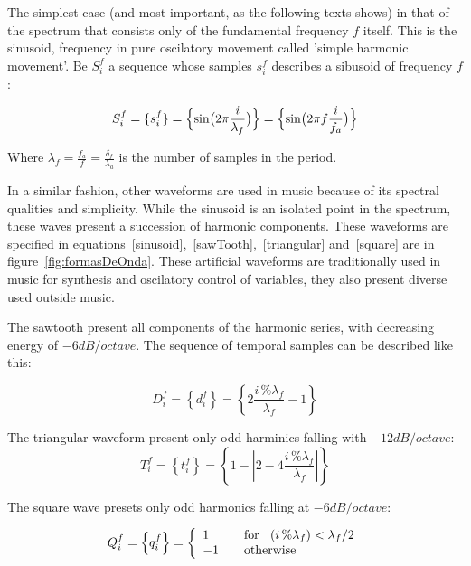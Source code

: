 \documentclass[
 aip,
 jmp,
 amsmath,amssymb,
 reprint,
]{revtex4-1}
\begin{document}
The simplest case (and most important, as the following texts shows) in that of the spectrum that consists only of the fundamental frequency $f$ itself. This is the sinusoid, frequency in pure oscilatory movement called 'simple harmonic movement'. Be $S_i^f$ a sequence whose samples $s_i^f$ describes a sibusoid of frequency $f$:

\begin{equation}\label{senoide}
     S^f_i=\{ s^f_i \}=\Bigl\{ \sin\bigl(2\pi \frac{i}{\lambda_f} \bigr)  \Bigr\} = \Bigl\{ \sin\bigl(2\pi f \frac{i}{f_a}\bigr)  \Bigr\} 
\end{equation}

Where $\lambda_f=\frac{f_a}{f}=\frac{\delta_f}{\lambda_a}$  is the number of samples in the period.

In a similar fashion, other waveforms are used in music because of its spectral qualities and simplicity. While the sinusoid is an isolated point in the spectrum, these waves present a succession of harmonic components. These waveforms are specified in equations~\ref{sinusoid},~\ref{sawTooth},~\ref{triangular} and~\ref{square} are in figure~\ref{fig:formasDeOnda}.
These artificial waveforms are traditionally used in music for synthesis and oscilatory control of variables, they also present diverse used outside music\cite{Openheim}.

The sawtooth present all components of the harmonic series, with decreasing energy of $-6dB/octave$. The sequence of temporal samples can be described like this:

\begin{equation}\label{sawTooth}
     D^f_i=\left\{ d^f_i \right\}=\left\{ 2\frac{i\,\%\lambda_f}{\lambda_f} -1 \right\}
\end{equation}

The triangular waveform present only odd harminics falling with $-12dB/octave$:
\begin{equation}\label{triangular}
     T^f_i=\left\{ t^f_i \right\}=\left\{1- \left| 2 - 4\frac{i\,\%\lambda_f}{\lambda_f} \right| \right\}
\end{equation}

The square wave presets only odd harmonics falling at $-6dB/octave$:

\begin{equation}\label{quadrada}
     Q^f_i=\left\{ q^f_i \right\}= \left\{
         \begin{array}{l l}
              1 & \quad \text{for } \; \; (i\,\%\lambda_f)   <  \lambda_f /2  \\
              -1 & \quad \text{otherwise}\\
         \end{array} \right.
\end{equation}
\end{document}
